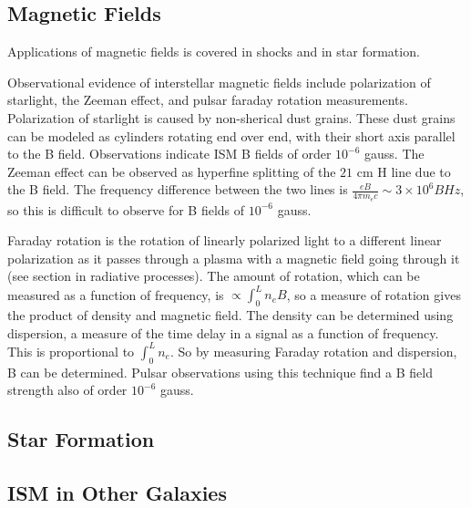 \subsection{Magnetic Fields}
Applications of magnetic fields is covered in shocks and in star formation.  

Observational evidence of interstellar magnetic fields include polarization 
of starlight, the Zeeman effect, and pulsar faraday rotation measurements.  
Polarization of starlight is caused by non-sherical dust grains.  These dust 
grains can be modeled as cylinders rotating end over end, with their short 
axis parallel to the B field.  Observations indicate ISM B fields of order 
$10^{-6}$ gauss.  The Zeeman effect can be observed as hyperfine splitting 
of the $21$ cm H line due to the B field.  The frequency difference between 
the two lines is $\frac{eB}{4\pi m_ec}\sim3\times10^6B Hz$, so this is 
difficult to observe for B fields of $10^{-6}$ gauss.  

Faraday rotation is the rotation of linearly polarized light to a different 
linear polarization as it passes through a plasma with a magnetic field going 
through it (see section in radiative processes).  The amount of rotation, which 
can be measured as a function of frequency, is 
$\propto \int_0^L n_eB$, so a measure of rotation gives the product of density 
and magnetic field.  The density can be determined using dispersion, a measure 
of the time delay in a signal as a function of frequency.  This is proportional 
to $\int_0^L n_e$.  So by measuring Faraday rotation and dispersion, B can 
be determined.  Pulsar observations using this technique find a B field 
strength also of order $10^{-6}$ gauss. 

\subsection{Star Formation}

\subsection{ISM in Other Galaxies}
